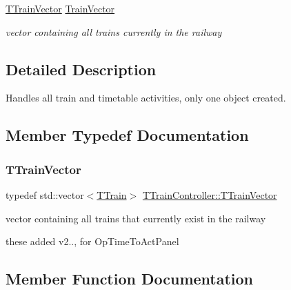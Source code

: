\begin{DoxyCompactItemize}
\mbox{\label{class_t_train_controller_a694986ff09f8a037b8bce849e40ac119}} 
\mbox{\hyperlink{class_t_train_controller_aa9073b97736a2733dbdaf8dc52e34c24}{T\+Train\+Vector}} \mbox{\hyperlink{class_t_train_controller_a694986ff09f8a037b8bce849e40ac119}{Train\+Vector}}
\begin{DoxyCompactList}\small\item\em vector containing all trains currently in the railway \end{DoxyCompactList}\end{DoxyCompactItemize}


\subsection{Detailed Description}
Handles all train and timetable activities, only one object created. 

\subsection{Member Typedef Documentation}
\mbox{\label{class_t_train_controller_aa9073b97736a2733dbdaf8dc52e34c24}} 
\subsubsection{\texorpdfstring{T\+Train\+Vector}{TTrainVector}}
{\footnotesize\ttfamily typedef std\+::vector$<$\mbox{\hyperlink{class_t_train}{T\+Train}}$>$ \mbox{\hyperlink{class_t_train_controller_aa9073b97736a2733dbdaf8dc52e34c24}{T\+Train\+Controller\+::\+T\+Train\+Vector}}}



vector containing all trains that currently exist in the railway 

these added v2.., for Op\+Time\+To\+Act\+Panel 

\subsection{Member Function Documentation}
\mbox{\label{class_t_train_controller_a7fbe0dc297130da79bcfa3503c6c51c1}} 
